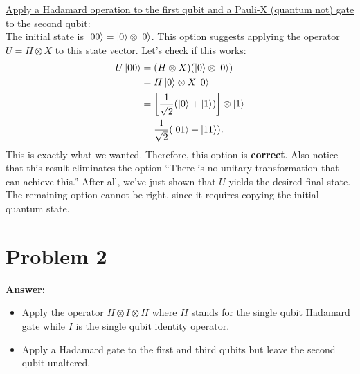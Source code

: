 \documentclass[11pt]{article}
\newcommand{\invroot}[1]{\frac{1}{\sqrt{#1}}}
\begin{document}
\uline{Apply a Hadamard operation to the first qubit and a Pauli-X (quantum not) gate
to the second qubit:}\\
The initial state is \(\ket{00}=\ket{0}\otimes\ket{0}\). This option suggests
applying the operator \(U=H\otimes X\) to this state vector. Let's check if
this works:
\begin{align}
  \begin{split}
    U\ket{00}&=(H\otimes X)(\ket{0}\otimes\ket{0})\\
    &=H\ket{0}\otimes X\ket{0}\\
    &=\left[\invroot{2}(\ket{0}+\ket{1})\right]\otimes\ket{1}\\
    &=\invroot{2}(\ket{01}+\ket{11}).
  \end{split}
\end{align}
This is exactly what we wanted. Therefore, this option is \textbf{correct}. Also notice
that this result eliminates the option ``There is no unitary transformation that
can achieve this.'' After all, we've just shown that \(U\) yields the desired
final state.\\

The remaining option cannot be right, since it requires copying the initial
quantum state.
\section*{Problem 2}
\label{sec:org4c53e5a}
\textbf{Answer:}
\begin{itemize}
\item Apply the operator \(H\otimes I\otimes H\) where \(H\) stands for the
single qubit Hadamard gate while \(I\) is the single qubit identity
operator.
\item Apply a Hadamard gate to the first and third qubits but leave the second qubit
unaltered.\\
\end{itemize}
\end{document}

